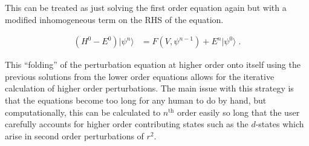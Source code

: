     \noindent This can be treated as just solving the first order equation again but with a modified inhomogeneous term on the RHS of the equation. 
    
    \begin{align}
        \left( H^0 - E^0 \right) \vert \psi^{n} \rangle &= F(V, \psi^{n-1}) + E^{n} \vert \psi^{0} \rangle\;.
    \end{align}

    \noindent This ``folding'' of the perturbation equation at higher order onto itself using the previous solutions from the lower order equations allows for the iterative calculation of higher order perturbations. The main issue with this strategy is that the equations become too long for any human to do by hand, but computationally, this can be calculated to $n^\text{th}$ order easily so long that the user carefully accounts for higher order contributing states such as the $d$-states which arise in second order perturbations of $r^2$. 

